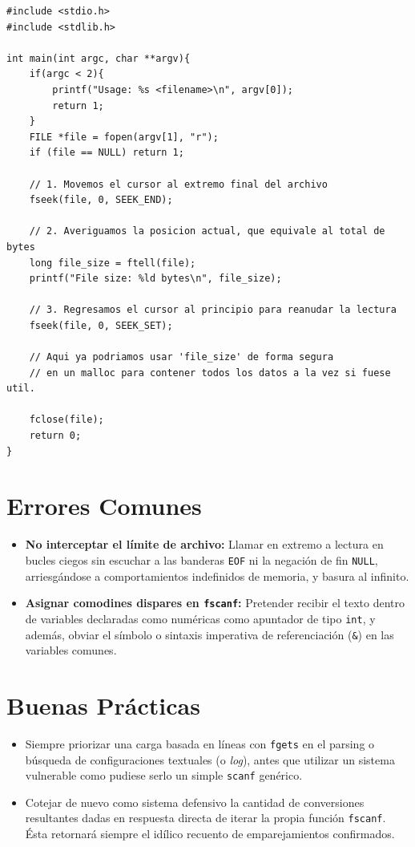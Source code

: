 \documentclass[12pt,a4paper]{article}
\begin{document}
\begin{lstlisting}
#include <stdio.h>
#include <stdlib.h>

int main(int argc, char **argv){
    if(argc < 2){
        printf("Usage: %s <filename>\n", argv[0]);
        return 1;
    }
    FILE *file = fopen(argv[1], "r");
    if (file == NULL) return 1;

    // 1. Movemos el cursor al extremo final del archivo
    fseek(file, 0, SEEK_END);
    
    // 2. Averiguamos la posicion actual, que equivale al total de bytes 
    long file_size = ftell(file);
    printf("File size: %ld bytes\n", file_size);
    
    // 3. Regresamos el cursor al principio para reanudar la lectura
    fseek(file, 0, SEEK_SET);
    
    // Aqui ya podriamos usar 'file_size' de forma segura 
    // en un malloc para contener todos los datos a la vez si fuese util.

    fclose(file);
    return 0;
}
\end{lstlisting}

\section{Errores Comunes}
\begin{itemize}
    \item \textbf{No interceptar el límite de archivo:} Llamar en extremo a lectura en bucles ciegos sin escuchar a las banderas \texttt{EOF} ni la negación de fin \texttt{NULL}, arriesgándose a comportamientos indefinidos de memoria, y basura al infinito.
    \item \textbf{Asignar comodines dispares en \texttt{fscanf}:} Pretender recibir el texto dentro de variables declaradas como numéricas como apuntador de tipo \texttt{int}, y además, obviar el símbolo o sintaxis imperativa de referenciación (\texttt{\&}) en las variables comunes.
\end{itemize}

\section{Buenas Prácticas}
\begin{itemize}
    \item Siempre priorizar una carga basada en líneas con \texttt{fgets} en el parsing o búsqueda de configuraciones textuales (o \textit{log}), antes que utilizar un sistema vulnerable como pudiese serlo un simple \texttt{scanf} genérico.
    \item Cotejar de nuevo como sistema defensivo la cantidad de conversiones resultantes dadas en respuesta directa de iterar la propia función \texttt{fscanf}. Ésta retornará siempre el idílico recuento de emparejamientos confirmados.
\end{itemize}
\end{document}
